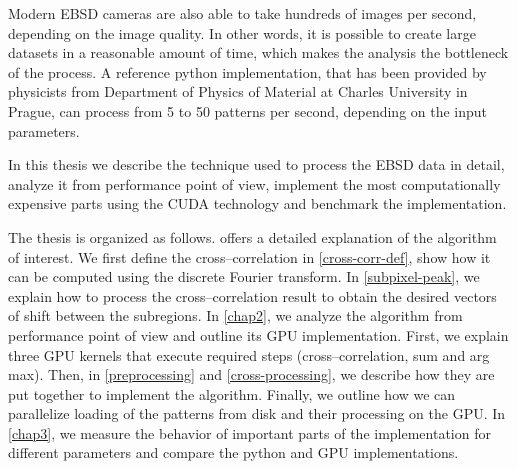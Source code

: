 Modern EBSD cameras are also able to take hundreds of images per second, depending on the image quality.
In other words, it is possible to create large datasets in a reasonable amount of time, which makes the analysis the bottleneck of the process.
A reference python implementation, that has been provided by physicists from Department of Physics of Material at Charles University in Prague, can process from 5 to 50 patterns per second, depending on the input parameters.

In this thesis we describe the technique used to process the EBSD data in detail, analyze it from performance point of view, implement the most computationally expensive parts using the CUDA technology and benchmark the implementation.

The thesis is organized as follows.  offers a detailed explanation of the algorithm of interest. We first define the cross--correlation in \cref{cross-corr-def}, show how it can be computed using the discrete Fourier transform. In \cref{subpixel-peak}, we explain how to process the cross--correlation result to obtain the desired vectors of shift between the subregions. In \cref{chap2}, we analyze the algorithm from performance point of view and outline its GPU implementation. First, we explain three GPU kernels that execute required steps (cross--correlation, sum and arg max). Then, in \cref{preprocessing} and \cref{cross-processing}, we describe how they are put together to implement the algorithm. Finally, we outline how we can parallelize loading of the patterns from disk and their processing on the GPU. In \cref{chap3}, we measure the behavior of important parts of the implementation for different parameters and compare the python and GPU implementations.


